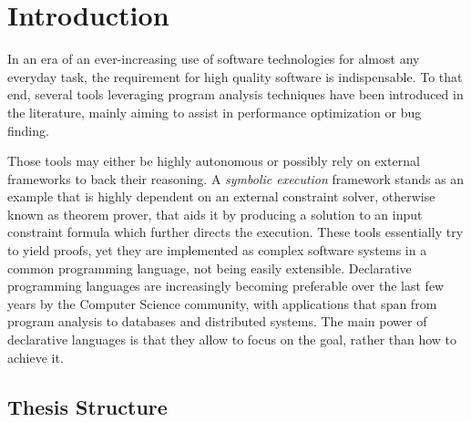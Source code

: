 
\chapter{Introduction}\label{c:introduction}

In an era of an ever-increasing use of software technologies
for almost any everyday task, the requirement for high quality software is indispensable. To
 that end, several tools leveraging program analysis techniques have been
introduced in the literature, mainly aiming to assist in performance optimization or bug finding.

Those tools may either be highly autonomous or possibly rely on external frameworks to back their reasoning.
A \emph{symbolic execution} framework stands as an example that is highly dependent on an
external constraint solver, otherwise known as theorem prover, that aids it by producing a solution to an input
constraint formula which further directs the execution. These tools essentially try to yield proofs, yet they
are implemented as complex software systems in a common programming language, not being easily extensible.
Declarative programming languages are increasingly becoming preferable over the last few years by
the Computer Science community, with applications that span from program analysis to databases and distributed
systems. The main power of declarative languages is that they allow to focus on the goal, rather than
how to achieve it.

\section{Thesis Structure}\label{s:structure}
